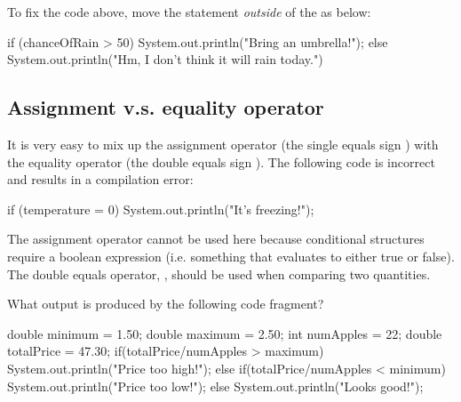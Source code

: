 \noindent To fix the code above, move the  statement \emph{outside} of the  as below:

\begin{code}
if (chanceOfRain > 50) 
{
    System.out.println("Bring an umbrella!");
} 
else 
{
    System.out.println("Hm, I don't think it will rain today.")
}
\end{code}

\subsection{Assignment v.s. equality operator}
It is very easy to mix up the assignment operator (the single equals sign \ic{=}) with the equality operator (the double equals sign \ic{==}). The following code is incorrect and results in a compilation error:

\begin{code}
if (temperature = 0) 
{
    System.out.println("It's freezing!");
}
\end{code}

\noindent The assignment operator cannot be used here because conditional structures require a boolean expression (i.e. something that evaluates to either true or false). The double equals operator, \ic{==}, should be used when comparing two quantities.

\exercisesection



\begin{exercise}
What output is produced by the following code fragment?

\begin{code}
double minimum = 1.50;
double maximum = 2.50;
int numApples = 22;
double totalPrice = 47.30;
if(totalPrice/numApples > maximum)
{
    System.out.println("Price too high!");
}
else if(totalPrice/numApples < minimum)
{
    System.out.println("Price too low!");
}
else
{
    System.out.println("Looks good!");
}
\end{code}
\end{exercise}


